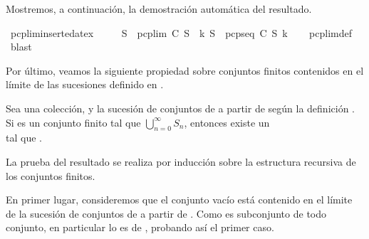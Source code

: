 \begin{isabellebody}
{\isafoldproof}%
%
\isadelimproof
%
\endisadelimproof
%
\begin{isamarkuptext}%
Mostremos, a continuación, la demostración automática del resultado.%
\end{isamarkuptext}\isamarkuptrue%
\isamarkupfalse%
\ pcp{\isacharunderscore}lim{\isacharunderscore}inserted{\isacharunderscore}at{\isacharunderscore}ex{\isacharcolon}\ \isanewline
\ \ \ \ {\isachardoublequoteopen}S{\isacharprime}\ {\isasymin}\ pcp{\isacharunderscore}lim\ C\ S\ {\isasymLongrightarrow}\ {\isasymexists}k{\isachardot}\ S{\isacharprime}\ {\isasymin}\ pcp{\isacharunderscore}seq\ C\ S\ k{\isachardoublequoteclose}\isanewline
%
\isadelimproof
\ \ %
\endisadelimproof
%
\isatagproof
{}\isamarkupfalse%
\ pcp{\isacharunderscore}lim{\isacharunderscore}def\ \isamarkupfalse%
\ blast%
\endisatagproof
{\isafoldproof}%
%
\isadelimproof
%
\endisadelimproof
%
\begin{isamarkuptext}%
Por último, veamos la siguiente propiedad sobre conjuntos finitos contenidos en el límite de 
  las sucesiones definido en .

\begin{lema}
  Sea  una colección,  y  la sucesión de conjuntos de  a partir de  según la
  definición . Si  es un conjunto finito tal que  $\bigcup_{n = 0}^{\infty} S_{n}$, 
  entonces existe un\\  tal que .
\end{lema}

\begin{demostracion}
  La prueba del resultado se realiza por inducción sobre la estructura recursiva de los conjuntos 
  finitos.

  En primer lugar, consideremos que el conjunto vacío está contenido en el límite de la sucesión de
  conjuntos de  a partir de . Como \isa{{\isacharbraceleft}{\isacharbraceright}} es subconjunto de todo conjunto, en particular lo es 
  de , probando así el primer caso.


\end{demostracion}
\end{isamarkuptext}
\end{isabellebody}

